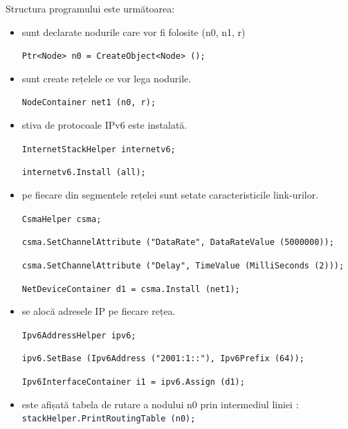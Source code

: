 \documentclass[12pt, a4paper, oneside, romanian]{teza-upb}
\begin{document}
Structura programului este următoarea: 
\begin{itemize}
 \item sunt declarate nodurile care vor fi folosite (n0, n1, r) 
 
 \texttt{Ptr<Node> n0 = CreateObject<Node> ();}
 
 \item sunt create rețelele ce vor lega nodurile.
 
 \texttt{NodeContainer net1 (n0, r);}
 
 \item stiva de protocoale IPv6 este instalată.
 
 \texttt{InternetStackHelper internetv6;}
 
 \texttt{internetv6.Install (all);}
 
 \item pe fiecare din segmentele rețelei sunt setate caracteristicile link-urilor.
 
  \texttt{CsmaHelper csma;}
  
  \texttt{csma.SetChannelAttribute ("DataRate", DataRateValue (5000000));}
  
  \texttt{csma.SetChannelAttribute ("Delay", TimeValue (MilliSeconds (2)));}
  
  \texttt{NetDeviceContainer d1 = csma.Install (net1);} 
  
  \newpage
  
  \item se alocă adresele IP pe fiecare rețea.
  
  \texttt{Ipv6AddressHelper ipv6;}
  
  \texttt{ipv6.SetBase (Ipv6Address ("2001:1::"), Ipv6Prefix (64));}
  
  \texttt{Ipv6InterfaceContainer i1 = ipv6.Assign (d1);}
  
  \item este afișată tabela de rutare a nodului n0 prin intermediul liniei : \texttt{stackHelper.PrintRoutingTable (n0);}
  

\end{itemize}
\end{document}
